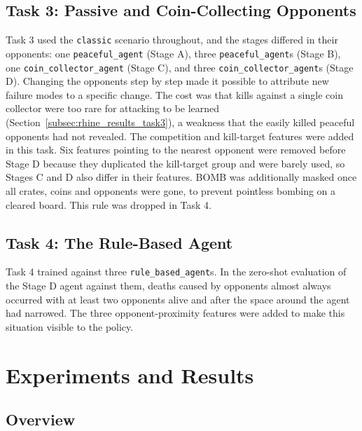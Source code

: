 \documentclass[11pt,a4paper]{report}
\begin{document}
	\section{Task 3: Passive and Coin-Collecting Opponents}
	\label{subsec:rhine_training_task3}
	
	Task 3 used the \texttt{classic} scenario throughout, and the stages differed in their opponents: one \texttt{peaceful\_agent} (Stage A), three \texttt{peaceful\_agent}s (Stage B), one \texttt{coin\_collector\_agent} (Stage C), and three \texttt{coin\_collector\_agent}s (Stage D). Changing the opponents step by step made it possible to attribute new failure modes to a specific change. The cost was that kills against a single coin collector were too rare for attacking to be learned (Section~\ref{subsec:rhine_results_task3}), a weakness that the easily killed peaceful opponents had not revealed. The competition and kill-target features were added in this task. Six features pointing to the nearest opponent were removed before Stage D because they duplicated the kill-target group and were barely used, so Stages C and D also differ in their features. BOMB was additionally masked once all crates, coins and opponents were gone, to prevent pointless bombing on a cleared board. This rule was dropped in Task 4.
	
	\section{Task 4: The Rule-Based Agent}
	\label{subsec:rhine_training_task4}
	
	Task 4 trained against three \texttt{rule\_based\_agent}s. In the zero-shot evaluation of the Stage D agent against them, deaths caused by opponents almost always occurred with at least two opponents alive and after the space around the agent had narrowed. The three opponent-proximity features were added to make this situation visible to the policy.
	
	
	\chapter{Experiments and Results}
	\label{chap:results}
	\label{sec:rhine_results}
	
	\section{Overview}
	\label{subsec:rhine_results_overview}
	
\end{document}
